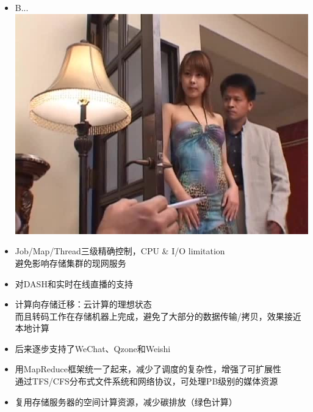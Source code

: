 \documentclass{beamer}
\begin{document}
\begin{frame}
\begin{itemize}
\item B...\\
\includegraphics[scale=0.40]{fig/bfj3.jpg}
\end{itemize}
\end{frame}

\begin{frame}
\begin{itemize}
\item Job/Map/Thread三级精确控制，CPU \& I/O limitation\\
避免影响存储集群的现网服务
\item 对DASH和实时在线直播的支持
\item 计算向存储迁移：云计算的理想状态\\
而且转码工作在存储机器上完成，避免了大部分的数据传输/拷贝，效果接近本地计算
\item 后来逐步支持了WeChat、Qzone和Weishi
\item 用MapReduce框架统一了起来，减少了调度的复杂性，增强了可扩展性\\
通过TFS/CFS分布式文件系统和网络协议，可处理PB级别的媒体资源
\item 复用存储服务器的空间计算资源，减少碳排放（绿色计算）
\end{itemize}
\end{frame}
\end{document}
